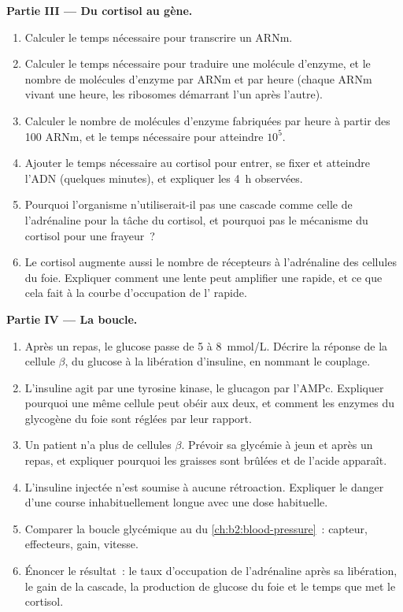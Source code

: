 \begin{problem}
\medskip
\noindent\textbf{Partie III --- Du cortisol au gène.}
\begin{enumerate}[resume]
  \item Calculer le temps nécessaire pour transcrire un ARNm.
  \item Calculer le temps nécessaire pour traduire une molécule
        d'enzyme, et le nombre de molécules d'enzyme par ARNm et par
        heure (chaque ARNm vivant une heure, les ribosomes démarrant l'un
        après l'autre).
  \item Calculer le nombre de molécules d'enzyme fabriquées par heure à
        partir des \num{100} ARNm, et le temps nécessaire pour atteindre
        $10^{5}$.
  \item Ajouter le temps nécessaire au cortisol pour entrer, se fixer et
        atteindre l'ADN (quelques minutes), et expliquer les \qty{4}{h}
        observées.
  \item Pourquoi l'organisme n'utiliserait-il pas une cascade comme celle
        de l'adrénaline pour la tâche du cortisol, et pourquoi pas le
        mécanisme du cortisol pour une frayeur~?
  \item Le cortisol augmente aussi le nombre de récepteurs à l'adrénaline
        des cellules du foie. Expliquer comment une  lente peut
        amplifier une  rapide, et ce que cela fait à la courbe
        d'occupation de l' rapide.
\end{enumerate}

\medskip
\noindent\textbf{Partie IV --- La boucle.}
\begin{enumerate}[resume]
  \item Après un repas, le glucose passe de 5 à \qty{8}{mmol/L}. Décrire
        la réponse de la cellule $\beta$, du glucose à la libération
        d'insuline, en nommant le couplage.
  \item L'insuline agit par une tyrosine kinase, le glucagon par l'AMPc.
        Expliquer pourquoi une même cellule peut obéir aux deux, et
        comment les enzymes du glycogène du foie sont réglées par leur
        rapport.
  \item Un patient n'a plus de cellules $\beta$. Prévoir sa glycémie à
        jeun et après un repas, et expliquer pourquoi les graisses sont
        brûlées et de l'acide apparaît.
  \item L'insuline injectée n'est soumise à aucune rétroaction. Expliquer
        le danger d'une course inhabituellement longue avec une dose
        habituelle.
  \item Comparer la boucle glycémique au  du
        \cref{ch:b2:blood-pressure}~: capteur, effecteurs, gain, vitesse.
  \item Énoncer le résultat~: le taux d'occupation de l'adrénaline après
        sa libération, le gain de la cascade, la production de glucose du
        foie et le temps que met le cortisol.
\end{enumerate}
\end{problem}
